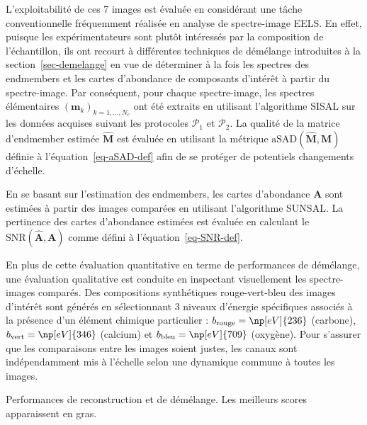 L'exploitabilité de ces 7 images est évaluée en considérant une tâche conventionnelle fréquemment réalisée en analyse de spectre-image EELS. En effet, puisque les expérimentateurs sont plutôt intéressés par la composition de l'échantillon, ils ont recourt à différentes techniques de démélange introduites à la section~\ref{sec-demelange} en vue de déterminer à la fois les spectres des endmembers et les cartes d'abondance de composants d'intérêt à partir du spectre-image. Par conséquent, pour chaque spectre-image, les spectres élémentaires $(\mathbf{m}_k)_{k=1,\dots,N_c}$ ont été extraits en utilisant l'algorithme SISAL sur les données acquises suivant les protocoles $\mathcal{P}_1$ et $\mathcal{P}_2$. La qualité de la matrice d'endmember estimée $\hat{\mathbf{M}}$ est évaluée en utilisant la métrique $\mathrm{aSAD}(\hat{\mathbf{M}},\mathbf{M})$ définie à l'équation~\eqref{eq-aSAD-def} afin de se protéger de potentiels changements d'échelle.

En se basant sur l'estimation des endmembers, les cartes d'abondance $\mathbf{A}$ sont estimées à partir des images comparées en utilisant l'algorithme SUNSAL. La pertinence des cartes d'abondance estimées est évaluée en calculant le $\mathrm{SNR}(\hat{\mathbf{A}}, \mathbf{A})$ comme défini à l'équation~\eqref{eq-SNR-def}.

En plus de cette évaluation quantitative en terme de performances de démélange, une évaluation qualitative est conduite en inspectant visuellement les spectre-images comparés. Des compositions synthétiques rouge-vert-bleu des images d'intérêt sont générés en sélectionnant 3 niveaux d'énergie spécifiques associés à la présence d'un élément chimique particulier : $b_\mathrm{rouge} = \np[eV]{236}$ (carbone), $b_\mathrm{vert} = \np[eV]{346}$ (calcium) et $b_\mathrm{bleu} = \np[eV]{709}$ (oxygène). Pour s'assurer que les comparaisons entre les images soient justes, les canaux sont indépendamment mis à l'échelle selon une dynamique commune à toutes les images.

\begin{table}[]
    \centering
    \caption{Performances de reconstruction et de démélange. Les meilleurs scores apparaissent en gras.
        \protect\label{tab-lr-metrics}}
    
\end{table}

\begin{mylandscape}
    \begin{normalfigure}
        \centering
        
        \caption{Ligne 1 : composition colorée des spectres-images oracle, acquis (Full\textsubscript{2ms}), débruités (protocole $\mathcal{P}_1$) et reconstruits (protocole $\mathcal{P}_2$). Lignes 2-5 : les cartes d'abondance estimées par SUNSAL pour les spectre-images correspondants.%
            \protect\label{fig-lr-maps}}
    \end{normalfigure}
\end{mylandscape}

